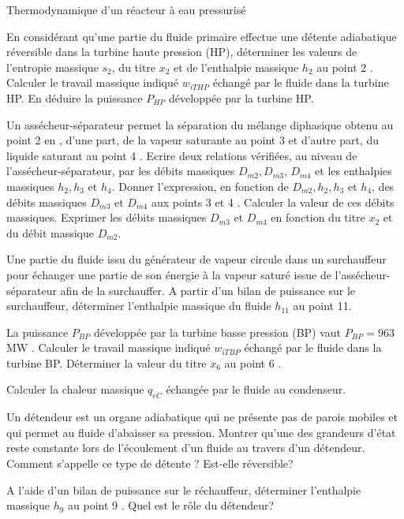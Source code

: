 \begin{exo}[PC][1][devoir]{Thermodynamique d'un réacteur à eau pressurisé}
\begin{quest}
\item En considérant qu'une partie du fluide primaire effectue une détente adiabatique réversible dans la turbine haute pression (HP), déterminer les valeurs de l'entropie massique $s_{2}$, du titre $x_{2}$ et de l'enthalpie massique $h_{2}$ au point 2 .\\
Calculer le travail massique indiqué $w_{i T H P}$ échangé par le fluide dans la turbine HP. En déduire la puissance $P_{H P}$ développée par la turbine HP.

\item Un assécheur-séparateur permet la séparation du mélange diphasique obtenu au point 2 en , d'une part, de la vapeur saturante au point 3 et d'autre part, du liquide saturant au point 4 . Ecrire deux relations vérifiées, au niveau de l'assécheur-séparateur, par les débits massiques $D_{m 2}, D_{m 3}$, $D_{m 4}$ et les enthalpies massiques $h_{2}, h_{3}$ et $h_{4}$. Donner l'expression, en fonction de $D_{m 2}, h_{2}, h_{3}$ et $h_{4}$, des débits massiques $D_{m 3}$ et $D_{m 4}$ aux points 3 et 4 . Calculer la valeur de ces débits massiques. Exprimer les débits massiques $D_{m 3}$ et $D_{m 4}$ en fonction du titre $x_{2}$ et du débit massique $D_{m 2}$.

\item Une partie du fluide issu du générateur de vapeur circule dans un surchauffeur pour échanger une partie de son énergie à la vapeur saturé issue de l'assécheur-séparateur afin de la surchauffer. A partir d'un bilan de puissance sur le surchauffeur, déterminer l'enthalpie massique du fluide $h_{11}$ au point 11.

\item La puissance $P_{B P}$ développée par la turbine basse pression (BP) vaut $P_{B P}=963$ MW . Calculer le travail massique indiqué $w_{i T B P}$ échangé par le fluide dans la turbine BP. Déterminer la valeur du titre $x_{6}$ au point 6 .

\item Calculer la chaleur massique $q_{e C}$ échangée par le fluide au condenseur.
\item Un détendeur est un organe adiabatique qui ne présente pas de parois mobiles et qui permet au fluide d'abaisser sa pression. Montrer qu'une des grandeurs d'état reste constante lors de l'écoulement d'un fluide au travers d'un détendeur. Comment s'appelle ce type de détente ? Est-elle réversible?

\item A l'aide d'un bilan de puissance sur le réchauffeur, déterminer l'enthalpie massique $h_{9}$ au point 9 . Quel est le rôle du détendeur?


\end{quest}
\end{exo}
